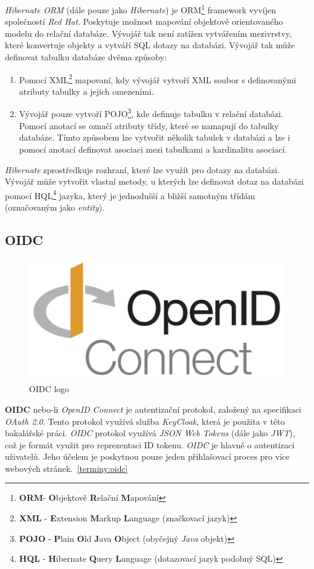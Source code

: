 \emph{Hibernate ORM} (dále pouze jako \emph{Hibernate}) je ORM\footnote{\textbf{ORM}- \textbf{O}bjektově \textbf{R}elační \textbf{M}apování} framework vyvíjen společností \emph{Red Hat}.
Poskytuje možnost mapování objektově orientovaného modelu do relační databáze. Vývojář tak není zatížen vytvářením mezivrstvy, které konvertuje objekty a vytváří SQL dotazy na databázi.
Vývojář tak může definovat tabulku databáze dvěma způsoby:
\begin{enumerate}
  \item Pomocí XML\footnote{\textbf{XML} - \textbf{E}xtension \textbf{M}arkup \textbf{L}anguage (značkovací jazyk)} mapovaní, kdy vývojář vytvoří XML soubor s definovanými atributy tabulky a jejich omezeními.
  \item Vývojář pouze vytvoří POJO\footnote{\textbf{POJO} - \textbf{P}lain \textbf{O}ld \textbf{J}ava \textbf{O}bject (obyčejný \emph{Java} objekt)}, kde definuje tabulku v relační databázi. Pomocí anotací se označí atributy třídy, které se namapují do tabulky databáze.
        Tímto způsobem lze vytvořit několik tabulek v databázi a lze i pomocí anotací definovat asociaci mezi tabulkami a kardinalitu asociací.
\end{enumerate}
\emph{Hibernate} zprostředkuje rozhraní, které lze využít pro dotazy na databázi. Vývojář může vytvořit vlastní metody, u kterých lze definovat dotaz na databázi pomocí HQL\footnote{\textbf{HQL} - \textbf{H}ibernate \textbf{Q}uery \textbf{L}anguage (dotazovací jazyk podobný SQL)} jazyka,
který je jednodušší a bližší samotným třídám (označovaným jako \emph{entity}).

\subsection{OIDC}
\label{app_prostredi:oidc}

\begin{figure}[hbt]
  \centering
  \includegraphics[width=.35 \linewidth]{obrazky-figures/OIDC.png}
  \caption{OIDC logo}
\end{figure}

\textbf{OIDC} nebo-li \emph{OpenID Connect} je autentizační protokol, založený na specifikaci \emph{OAuth 2.0}. Tento protokol využívá služba \emph{KeyCloak}, která je použita v této bakalářské práci.
\emph{OIDC} protokol využívá \emph{JSON Web Tokens} (dále jako \emph{JWT}), což je formát využit pro reprezentaci ID tokenu. \emph{OIDC} je hlavně o autentizaci uživatelů.
Jeho účelem je poskytnou pouze jeden přihlašovací proces pro více webových stránek.~\ref{terminy:oidc}

